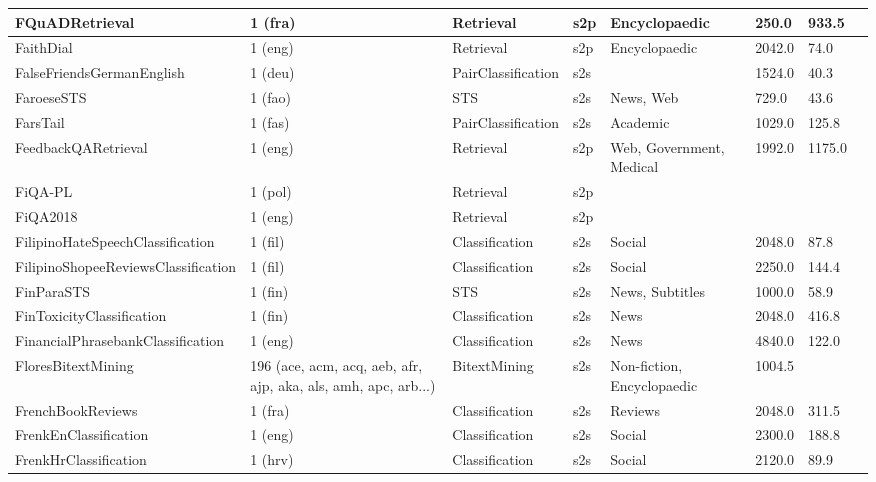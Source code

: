 \begin{longtable}{L{5.0cm}|L{1.5cm}L{1.4cm}L{1.4cm}L{1.4cm}L{1.4cm}L{1.0cm}L{1.0cm}}
 \hline 
FQuADRetrieval \cite{dhoffschmidt-etal-2020-fquad} & 1 (fra) & Retrieval & s2p & Encyclopaedic & 250.0 & 933.5 \\
 \hline 
FaithDial \cite{dziri2022faithdial} & 1 (eng) & Retrieval & s2p & Encyclopaedic & 2042.0 & 74.0 \\
 \hline 
FalseFriendsGermanEnglish \cite{Chibb_2022} & 1 (deu) & PairClassification & s2s &  & 1524.0 & 40.3 \\
 \hline 
FaroeseSTS \cite{snaebjarnarson-etal-2023-transfer} & 1 (fao) & STS & s2s & News, Web & 729.0 & 43.6 \\
 \hline 
FarsTail \cite{amirkhani2023farstail} & 1 (fas) & PairClassification & s2s & Academic & 1029.0 & 125.8 \\
 \hline 
FeedbackQARetrieval \cite{li-etal-2022-using} & 1 (eng) & Retrieval & s2p & Web, Government, Medical & 1992.0 & 1175.0 \\
 \hline 
FiQA-PL \cite{thakur2021beir} & 1 (pol) & Retrieval & s2p &  &  &  \\
 \hline 
FiQA2018 \cite{thakur2021beir} & 1 (eng) & Retrieval & s2p &  &  &  \\
 \hline 
FilipinoHateSpeechClassification \cite{Cabasag-2019-hate-speech} & 1 (fil) & Classification & s2s & Social & 2048.0 & 87.8 \\
 \hline 
FilipinoShopeeReviewsClassification \cite{riegoenhancement} & 1 (fil) & Classification & s2s & Social & 2250.0 & 144.4 \\
 \hline 
FinParaSTS \cite{kanerva-etal-2021-finnish} & 1 (fin) & STS & s2s & News, Subtitles & 1000.0 & 58.9 \\
 \hline 
FinToxicityClassification \cite{eskelinen-etal-2023-toxicity} & 1 (fin) & Classification & s2s & News & 2048.0 & 416.8 \\
 \hline 
FinancialPhrasebankClassification \cite{Malo2014GoodDO} & 1 (eng) & Classification & s2s & News & 4840.0 & 122.0 \\
 \hline 
FloresBitextMining \cite{goyal2022flores} & 196 (ace, acm, acq, aeb, afr, ajp, aka, als, amh, apc, arb...) & BitextMining & s2s & Non-fiction, Encyclopaedic & 1004.5 &  \\
 \hline 
FrenchBookReviews  & 1 (fra) & Classification & s2s & Reviews & 2048.0 & 311.5 \\
 \hline 
FrenkEnClassification \cite{ljubešić2019frenk} & 1 (eng) & Classification & s2s & Social & 2300.0 & 188.8 \\
 \hline 
FrenkHrClassification \cite{ljubešić2019frenk} & 1 (hrv) & Classification & s2s & Social & 2120.0 & 89.9 \\

\end{longtable}
